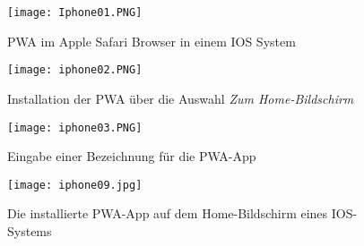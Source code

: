 \begin{figure}[!htb]
    \begin{minipage}[b]{.4\linewidth} %
       \texttt{[image: Iphone01.PNG]}
       \caption{PWA im Apple Safari Browser in einem IOS System}
       \label{img:iphone01}
    \end{minipage}
    \hspace{.1\linewidth}%
    \begin{minipage}[b]{.4\linewidth} %
       \texttt{[image: iphone02.PNG]}
       \caption{Installation der PWA über die Auswahl \textit{Zum Home-Bildschirm}}
    \end{minipage}
 \end{figure}

 \begin{figure}[!htb]
    \begin{minipage}[b]{.4\linewidth} %
       \texttt{[image: iphone03.PNG]}
       \caption{Eingabe einer Bezeichnung für die PWA-App}
    \end{minipage}
    \hspace{.1\linewidth}%
    \begin{minipage}[b]{.4\linewidth} %
       \texttt{[image: iphone09.jpg]}
       \caption{Die installierte PWA-App auf dem Home-Bildschirm eines IOS-Systems }
       \label{img:iphone0n}
    \end{minipage}
 \end{figure}


